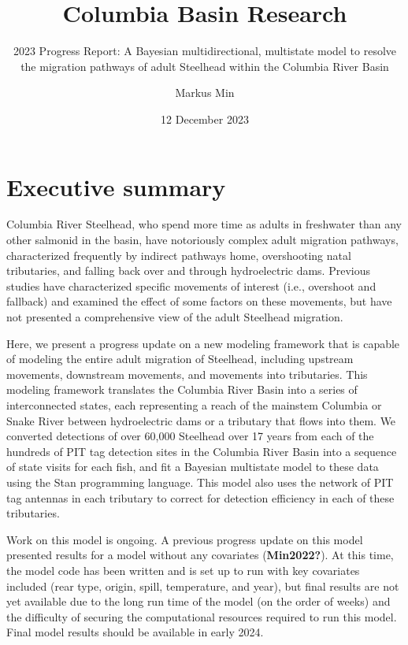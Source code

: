 \documentclass[
  12pt,
]{report}
\title{Columbia Basin Research}
\subtitle{2023 Progress Report: A Bayesian multidirectional, multistate
model to resolve the migration pathways of adult Steelhead within the
Columbia River Basin}
\author{Markus Min}
\date{12 December 2023}
\begin{document}
\maketitle

{
\hypersetup{linkcolor=}
\setcounter{tocdepth}{2}
\tableofcontents
}
\hypertarget{executive-summary}{%
\chapter{Executive summary}\label{executive-summary}}

Columbia River Steelhead, who spend more time as adults in freshwater
than any other salmonid in the basin, have notoriously complex adult
migration pathways, characterized frequently by indirect pathways home,
overshooting natal tributaries, and falling back over and through
hydroelectric dams. Previous studies have characterized specific
movements of interest (i.e., overshoot and fallback) and examined the
effect of some factors on these movements, but have not presented a
comprehensive view of the adult Steelhead migration.

Here, we present a progress update on a new modeling framework that is
capable of modeling the entire adult migration of Steelhead, including
upstream movements, downstream movements, and movements into
tributaries. This modeling framework translates the Columbia River Basin
into a series of interconnected states, each representing a reach of the
mainstem Columbia or Snake River between hydroelectric dams or a
tributary that flows into them. We converted detections of over 60,000
Steelhead over 17 years from each of the hundreds of PIT tag detection
sites in the Columbia River Basin into a sequence of state visits for
each fish, and fit a Bayesian multistate model to these data using the
Stan programming language. This model also uses the network of PIT tag
antennas in each tributary to correct for detection efficiency in each
of these tributaries.

Work on this model is ongoing. A previous progress update on this model
presented results for a model without any covariates
(\textbf{Min2022?}). At this time, the model code has been written and
is set up to run with key covariates included (rear type, origin, spill,
temperature, and year), but final results are not yet available due to
the long run time of the model (on the order of weeks) and the
difficulty of securing the computational resources required to run this
model. Final model results should be available in early 2024.
\end{document}
